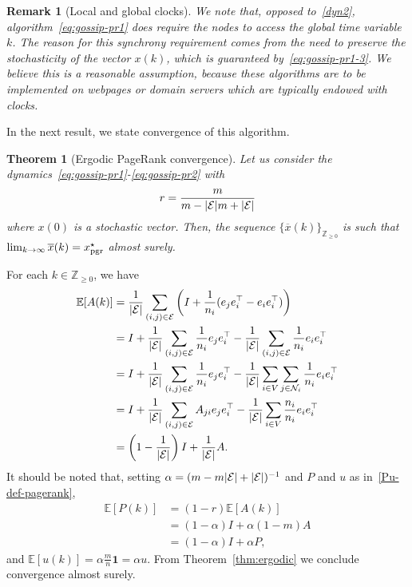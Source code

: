 \documentclass{IEEEtran}
\newtheorem{theorem}{Theorem}
\newtheorem{remark}{Remark}
\newcommand{\subscr}[2]{#1_{\textup{#2}}}
\newcommand{\integernonnegative}{\mathbb{Z}_{\ge 0}}
\newcommand{\neigh}{ \mathcal{N}} 	\newcommand{\card}[1]{|#1|}
\def\Exp{\mathbb{E}}
\newcommand{\pgr}{{\subscr{x}{pgr}^{\star}}} \newcommand{\loc}{{\subscr{x}{loc}^{\star}}} \newcommand{\op}{{\subscr{x}{opd}^{\star}}}
\newcommand{\1}{\mathbf{1}} \newcommand{\ind}{\mathds{1}}
\begin{document}
\begin{remark}[Local and global clocks]
We note that, opposed to~\eqref{dyn2}, algorithm~\eqref{eq:gossip-pr1} does require the nodes to access the global time variable $k$. The reason for this synchrony requirement comes from the need to preserve the stochasticity of the vector $x(k)$, which is guaranteed by~\eqref{eq:gossip-pr1-3}. We believe this is a reasonable assumption, because these algorithms are to be implemented on webpages or domain servers which are typically endowed with clocks.
\end{remark}

In the next result, we state convergence of this algorithm.
\begin{theorem}[Ergodic PageRank convergence]
\label{cor:pagerank}
Let us consider the dynamics~\eqref{eq:gossip-pr1}-\eqref{eq:gossip-pr2} with 
$$
r=\frac{m}{m-\card{\E}m+\card{\E}}
$$ 
where $x(0)$ is a stochastic vector. Then, the
sequence $\{\overline{x}(k)\}_{\integernonnegative}$ 
is such that 
$
\lim_{k\to\infty} \overline{x}(k)=\pgr
$
almost surely. 
\end{theorem}

\begin{IEEEproof}
For each $k\in\integernonnegative$, we have
\begin{align*}
\Exp[A(k)]&=\frac{1}{\card{\E}}\sum_{(i,j)\in \E}\left(I+\frac1{n_i}(e_je_i^\top-e_ie_i^\top)\right)\\
&=I+\frac{1}{\card{\E}}\sum_{(i,j)\in \E} \frac1{n_i} e_je_i^\top-\frac{1}{\card{\E}}\sum_{(i,j)\in \E} \frac1{n_i} e_ie_i^\top\\
&=I+\frac{1}{\card{\E}}\sum_{(i,j)\in \E} \frac1{n_i} e_je_i^\top-\frac{1}{\card{\E}}\sum_{i\in V} \sum_{j\in \neigh_i} \frac1{n_i} e_ie_i^\top\\
&=I+\frac{1}{\card{\E}}\sum_{(i,j)\in \E} A_{ji}e_je_i^\top-\frac{1}{\card{\E}}\sum_{i\in V} \frac{n_i}{n_i} e_ie_i^\top\\
&=\left(1-\frac1{|\E|}\right) I+ \frac1{|\E|} A.
\end{align*}
It should be noted that, setting $\alpha=({m-m\card{\E}+\card{\E}})^{-1}$ and $P$ and $u$ as in~\eqref{Pu-def-pagerank},
\begin{align*}
\Exp[P(k)]&=(1-r)\Exp[A(k)]\\
&=\left(1-\alpha\right)I+\alpha (1-m)A\\
&=\left(1-\alpha\right)I+\alpha P,
\end{align*}
and $\Exp[u(k)]=\alpha\frac{m}{n}\1=\alpha u.$
From Theorem~\ref{thm:ergodic} we conclude convergence almost surely. 
\end{IEEEproof}
\end{document}
